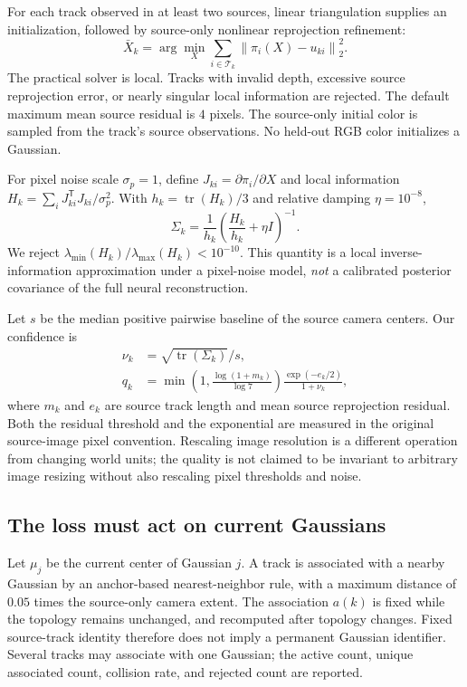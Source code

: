 \documentclass[10pt,twocolumn,letterpaper]{article}
\newcommand{\norm}[1]{\left\lVert#1\right\rVert}
\newcommand{\cT}{\mathcal{T}}
\begin{document}
For each track observed in at least two sources, linear triangulation supplies an initialization, followed by source-only nonlinear reprojection refinement:
\begin{equation}
\bar X_k=\arg\min_X\sum_{i\in\cT_k}\norm{\pi_i(X)-u_{ki}}_2^2.
\label{eq:triangulation}
\end{equation}
The practical solver is local. Tracks with invalid depth, excessive source reprojection error, or nearly singular local information are rejected. The default maximum mean source residual is $4$ pixels. The source-only initial color is sampled from the track's source observations. No held-out RGB color initializes a Gaussian.

For pixel noise scale $\sigma_p=1$, define $J_{ki}=\partial\pi_i/\partial X$ and local information $H_k=\sum_i J_{ki}^{\mathsf T}J_{ki}/\sigma_p^2$. With $h_k=\operatorname{tr}(H_k)/3$ and relative damping $\eta=10^{-8}$,
\begin{equation}
\Sigma_k=\frac{1}{h_k}\left(\frac{H_k}{h_k}+\eta I\right)^{-1}.
\label{eq:covariance}
\end{equation}
We reject $\lambda_{\min}(H_k)/\lambda_{\max}(H_k)<10^{-10}$. This quantity is a local inverse-information approximation under a pixel-noise model, \emph{not} a calibrated posterior covariance of the full neural reconstruction.

Let $s$ be the median positive pairwise baseline of the source camera centers. Our confidence is
\begin{align}
\nu_k&=\sqrt{\operatorname{tr}(\Sigma_k)}/s,\\
q_k&=\min\!\left(1,\frac{\log(1+m_k)}{\log 7}\right)
\frac{\exp(-e_k/2)}{1+\nu_k},
\label{eq:quality}
\end{align}
where $m_k$ and $e_k$ are source track length and mean source reprojection residual. Both the residual threshold and the exponential are measured in the original source-image pixel convention. Rescaling image resolution is a different operation from changing world units; the quality is not claimed to be invariant to arbitrary image resizing without also rescaling pixel thresholds and noise.

\subsection{The loss must act on current Gaussians}
Let $\mu_j$ be the current center of Gaussian $j$. A track is associated with a nearby Gaussian by an anchor-based nearest-neighbor rule, with a maximum distance of $0.05$ times the source-only camera extent. The association $a(k)$ is fixed while the topology remains unchanged, and recomputed after topology changes. Fixed source-track identity therefore does not imply a permanent Gaussian identifier. Several tracks may associate with one Gaussian; the active count, unique associated count, collision rate, and rejected count are reported.
\end{document}
